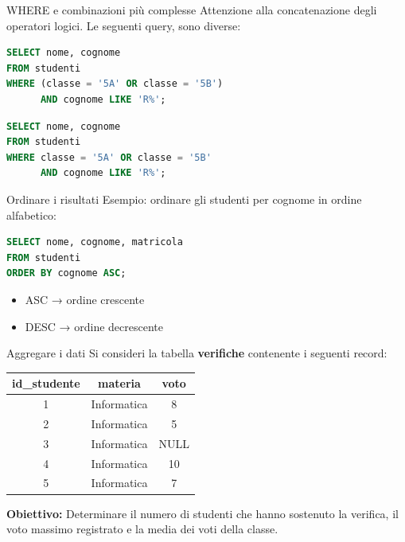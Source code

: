 \documentclass{beamer}
\begin{document}
\begin{frame}[fragile]{WHERE e combinazioni più complesse}
Attenzione alla concatenazione degli operatori logici. Le seguenti query, sono diverse:

\begin{lstlisting}[language=SQL]
SELECT nome, cognome
FROM studenti
WHERE (classe = '5A' OR classe = '5B')
      AND cognome LIKE 'R%';
\end{lstlisting}

\begin{lstlisting}[language=SQL]
SELECT nome, cognome
FROM studenti
WHERE classe = '5A' OR classe = '5B'
      AND cognome LIKE 'R%';
\end{lstlisting}

\end{frame}

\begin{frame}[fragile]{Ordinare i risultati}
Esempio: ordinare gli studenti per cognome in ordine alfabetico:

\begin{lstlisting}[language=SQL]
SELECT nome, cognome, matricola
FROM studenti
ORDER BY cognome ASC;
\end{lstlisting}

\medskip
\begin{itemize}
    \item ASC → ordine crescente
    \item DESC → ordine decrescente
\end{itemize}
\end{frame}






\begin{frame}[fragile]{Aggregare i dati}
Si consideri la tabella \textbf{verifiche} contenente i seguenti record:

\begin{center}
\begin{tabular}{|c|c|c|}
\hline
\textbf{id\_studente} & \textbf{materia} & \textbf{voto} \\ \hline
1 & Informatica & 8 \\ \hline
2 & Informatica & 5 \\ \hline
3 & Informatica & NULL \\ \hline
4 & Informatica & 10 \\ \hline
5 & Informatica & 7 \\ \hline
\end{tabular}
\end{center}

\medskip
\textbf{Obiettivo:} Determinare il numero di studenti che hanno sostenuto la verifica, il voto massimo registrato e la media dei voti della classe.
\end{frame}
\end{document}
